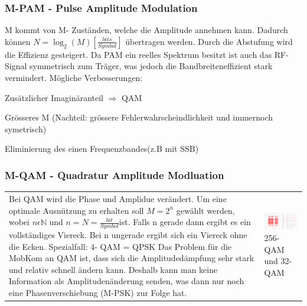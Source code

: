 \subsubsection{M-PAM - Pulse Amplitude Modulation }
M kommt von M- Zuständen, welche die Amplitude annehmen kann. Dadurch können
$N=\log_2(M) [\frac{bits}{Symbol}]$ übertragen werden. Durch die Abstufung wird
die Effizienz gesteigert. Da PAM ein reelles Spektrum besitzt ist auch das
RF-Signal symmetrisch zum Träger, was jedoch die Bandbreiteneffizient stark
vermindert. Mögliche Verbesserungen:\\
\begin{liste}
	\item Zusätzlicher Imaginäranteil $\Longrightarrow$ QAM
	\item Grösseres M (Nachteil: grössere Fehlerwahrscheindlichkeit und immernoch
	symetrisch)
	\item Eliminierung des einen Frequenzbandes(z.B mit SSB)
\end{liste}

\subsubsection{M-QAM - Quadratur Amplitude Modluation }
\begin{tabular}{ll}
\parbox{10cm}{
	Bei QAM wird die Phase und Amplidue verändert. Um eine optimale Ausnützung zu
	erhalten soll $M=2^n$ gewählt werden, wobei $n \epsilon \mathbb{N}$ und 
	$n=N=\frac{bit}{Symbol}$ist.\\
	Falls n gerade dann ergibt es ein vollständiges Viereck.\\
	Bei n ungerade ergibt sich ein Viereck ohne die Ecken.\\
	Spezialfall: 4- QAM = QPSK\\
	Das Problem für die MobKom an QAM ist, dass sich die Amplitudedämpfung sehr
	stark und relativ schnell ändern kann. Deshalb kann man keine Information als
	Amplitudenänderung senden, was dann nur noch eine Phasenverschiebung (M-PSK)
	zur Folge hat.} 
	& \parbox{8cm}{
	\includegraphics[width=8cm]{./bilder/modulation_constellationQAM.png}\\ 256-QAM und 32-QAM
}
\end{tabular}

